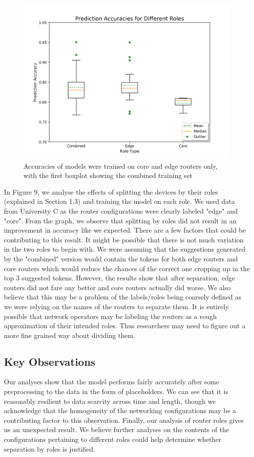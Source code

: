 \begin{figure}[H]
	\centering
	\includegraphics[width=\textwidth]{roles.png}
	\caption{Accuracies of models were trained on core and edge routers only, with the first boxplot showing the combined training set}
\end{figure}
In Figure 9, we analyse the effects of splitting the devices by their roles (explained in Section 1.3) and training the model on each role. We used data from University C as the router configurations were clearly labeled "edge" and "core". From the graph, we observe that splitting by roles did not result in an improvement in accuracy like we expected. There are a few factors that could be contributing to this result. It might be possible that there is not much variation in the two roles to begin with. We were assuming that the suggestions generated by the "combined" version would contain the tokens for both edge routers and core routers which would reduce the chances of the correct one cropping up in the top 3 suggested tokens. However, the results show that after separation, edge routers did not fare any better and core routers actually did worse. We also believe that this may be a problem of the labels/roles being coarsely defined as we were relying on the names of the routers to separate them. It is entirely possible that network operators may be labeling the routers as a rough approximation of their intended roles. Thus researchers may need to figure out a more fine grained way about dividing them.\\

\subsection{Key Observations}
Our analyses show that the model performs fairly accurately after some preprocessing to the data in the form of placeholders. We can see that it is reasonably resilient to data scarcity across time and length, though we acknowledge that the homogeneity of the networking configurations may be a contributing factor to this observation. Finally, our analysis of router roles gives us an unexpected result. We believe further analyses on the contents of the configurations pertaining to different roles could help determine whether separation by roles is justified.
